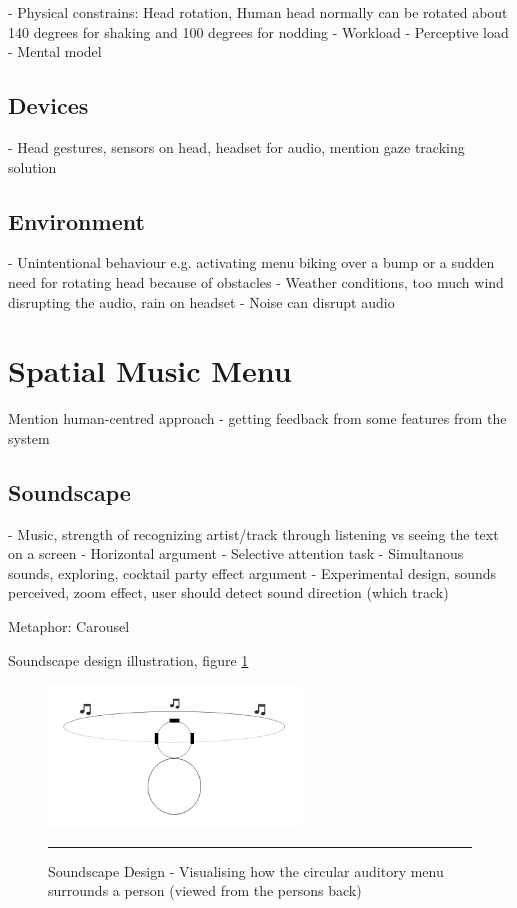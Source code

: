 

- Physical constrains: Head rotation, Human head normally can be rotated about 140 degrees for shaking and 100 degrees for nodding \cite{lopresti_neck_2000}
- Workload
- Perceptive load
- Mental model

\subsection{Devices}
- Head gestures, sensors on head, headset for audio, mention gaze tracking solution

\subsection{Environment}
- Unintentional behaviour e.g. activating menu biking over a bump or a sudden need for rotating head because of obstacles
- Weather conditions, too much wind disrupting the audio, rain on headset
- Noise can disrupt audio


\section{Spatial Music Menu}
Mention human-centred approach - getting feedback from some features from the system

\subsection{Soundscape}
- Music, strength of recognizing artist/track through listening vs seeing the text on a screen
- Horizontal argument
- Selective attention task
- Simultanous sounds, exploring, cocktail party effect argument
- Experimental design, sounds perceived, zoom effect, user should detect sound direction (which track)

Metaphor: Carousel

Soundscape design illustration, figure \ref{fig:sounddesign}

\begin{figure}[t]
	\centering
		\includegraphics[width=0.6\textwidth,height=\textheight,keepaspectratio]{./Figures/sounddesign.png}
		\rule{35em}{0.5pt}
	\caption[Soundscape Design]{Soundscape Design - Visualising how the circular auditory menu surrounds a person (viewed from the persons back)}
	\label{fig:sounddesign}
\end{figure}

